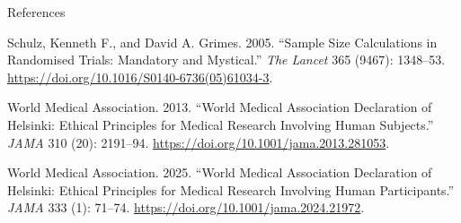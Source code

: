 \documentclass[
  ignorenonframetext,
]{beamer}
\newlength{\cslhangindent}
\newenvironment{CSLReferences}[2] %
 {\begin{list}{}{%
  \setlength{\itemindent}{0pt}
  \setlength{\leftmargin}{0pt}
  \setlength{\parsep}{0pt}
  \ifodd #1
   \setlength{\leftmargin}{\cslhangindent}
   \setlength{\itemindent}{-1\cslhangindent}
  \fi
  \setlength{\itemsep}{#2\baselineskip}}}
 {\end{list}}
\begin{document}
\begin{frame}[allowframebreaks]{References}
\begin{CSLReferences}{1}{1}
Schulz, Kenneth F., and David A. Grimes. 2005. {``Sample Size
Calculations in Randomised Trials: Mandatory and Mystical.''} \emph{The
Lancet} 365 (9467): 1348--53.
\url{https://doi.org/10.1016/S0140-6736(05)61034-3}.

World Medical Association. 2013. {``World {Medical Association
Declaration} of {Helsinki}: {Ethical Principles} for {Medical Research
Involving Human Subjects}.''} \emph{JAMA} 310 (20): 2191--94.
\url{https://doi.org/10.1001/jama.2013.281053}.

World Medical Association. 2025. {``World {Medical Association
Declaration} of {Helsinki}: {Ethical Principles} for {Medical Research
Involving Human Participants}.''} \emph{JAMA} 333 (1): 71--74.
\url{https://doi.org/10.1001/jama.2024.21972}.

\end{CSLReferences}
\end{frame}
\end{document}
